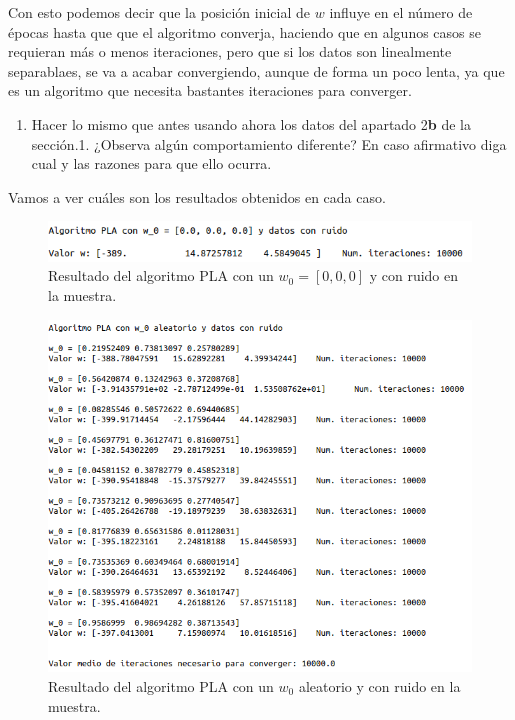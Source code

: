 \documentclass[11pt,a4paper]{article}
\begin{document}
Con esto podemos decir que la posición inicial de $w$ influye en el número de épocas hasta que
que el algoritmo converja, haciendo que en algunos casos se requieran más o menos iteraciones,
pero que si los datos son linealmente separablaes, se va a acabar convergiendo, aunque de forma un
poco lenta, ya que es un algoritmo que necesita bastantes iteraciones para converger.

\begin{enumerate}[resume,label=\textit{\alph*})]
	\item Hacer lo mismo que antes usando ahora los datos del apartado 2\textbf{b} de la sección.1.
	¿Observa algún comportamiento diferente? En caso afirmativo diga cual y las razones para que ello
	ocurra.
\end{enumerate}

Vamos a ver cuáles son los resultados obtenidos en cada caso.

\begin{figure}[H]
\centering
\includegraphics[scale=0.6]{img/pla_0_noise.png}
\caption{Resultado del algoritmo PLA con un $w_0 = [0, 0, 0]$ y con ruido en la muestra.}
\end{figure}

\begin{figure}[H]
\centering
\includegraphics[scale=0.52]{img/pla_rand_noise.png}
\caption{Resultado del algoritmo PLA con un $w_0$ aleatorio y con ruido en la muestra.}
\end{figure}
\end{document}
